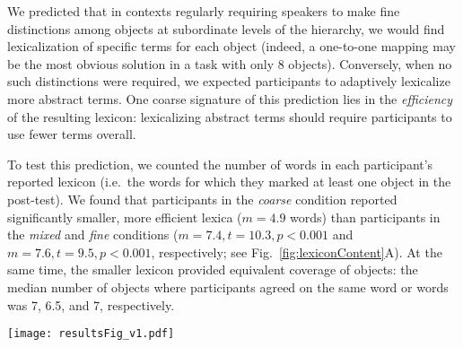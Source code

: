We predicted that in contexts regularly requiring speakers to make fine distinctions among objects at subordinate levels of the hierarchy, we would find lexicalization of specific terms for each object (indeed, a one-to-one mapping may be the most obvious solution in a task with only 8 objects). Conversely, when no such distinctions were required, we expected participants to adaptively lexicalize more abstract terms. One coarse signature of this prediction lies in the \emph{efficiency} of the resulting lexicon: lexicalizing abstract terms should require participants to use fewer terms overall.

To test this prediction, we counted the number of words in each participant's reported lexicon (i.e.\ the words for which they marked at least one object in the post-test). We found that participants in the \emph{coarse} condition reported significantly smaller, more efficient lexica ($m = 4.9$ words) than participants in the \emph{mixed} and \emph{fine} conditions ($m = 7.4, t = 10.3, p <0.001$ and $m = 7.6, t = 9.5, p < 0.001$, respectively; see Fig.\ \ref{fig:lexiconContent}A). At the same time, the smaller lexicon provided equivalent coverage of objects: the median number of objects where participants agreed on the same word or words was 7, 6.5, and 7, respectively. 

\begin{figure*}[t]
\begin{center}
{\texttt{[image: resultsFig\_v1.pdf]}}
\vspace{-2ex}
{\caption{{Pragmatic demands of context shape the formation of abstractions. (A) Mean number of words participants reported with specific meanings (applying to 1 object) or abstract meanings (applying to 2 objects).
(B) Diversity of terms within reported lexica: many participants in the \emph{coarse} condition reported a mixture of abstract and specific terms.%
\label{fig:lexiconContent}}}}
\end{center}
\vspace{-2ex}
\end{figure*}

